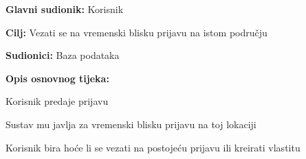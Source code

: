 					\noindent {}
					\begin{packed_item}
	
						\item \textbf{Glavni sudionik: }Korisnik
						\item  \textbf{Cilj:} Vezati se na vremenski blisku prijavu na istom području
						\item  \textbf{Sudionici:} Baza podataka
						\item  \textbf{Opis osnovnog tijeka:}
						
						\item[] \begin{packed_enum}
	
							\item Korisnik predaje prijavu
							\item Sustav mu javlja za vremenski blisku prijavu na toj lokaciji
							\item Korisnik bira hoće li se vezati na postojeću prijavu ili kreirati vlastitu
						\end{packed_enum}
					\end{packed_item}
					
					\pagebreak
					
